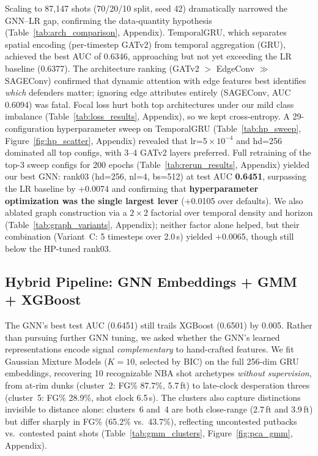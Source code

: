 \documentclass{article}
\begin{document}
Scaling to 87,147 shots (70/20/10 split, seed 42) dramatically narrowed the GNN--LR gap, confirming the data-quantity hypothesis (Table~\ref{tab:arch_comparison}, Appendix). TemporalGRU, which separates spatial encoding (per-timestep GATv2) from temporal aggregation (GRU), achieved the best AUC of 0.6346, approaching but not yet exceeding the LR baseline (0.6377). The architecture ranking (GATv2 $>$ EdgeConv $\gg$ SAGEConv) confirmed that dynamic attention with edge features best identifies \emph{which} defenders matter; ignoring edge attributes entirely (SAGEConv, AUC 0.6094) was fatal. Focal loss hurt both top architectures under our mild class imbalance (Table~\ref{tab:loss_results}, Appendix), so we kept cross-entropy. A 29-configuration hyperparameter sweep on TemporalGRU (Table~\ref{tab:hp_sweep}, Figure~\ref{fig:hp_scatter}, Appendix) revealed that lr=$5\!\times\!10^{-4}$ and hd=256 dominated all top configs, with 3--4 GATv2 layers preferred. Full retraining of the top-3 sweep configs for 200 epochs (Table~\ref{tab:rerun_results}, Appendix) yielded our best GNN: rank03 (hd=256, nl=4, bs=512) at test AUC \textbf{0.6451}, surpassing the LR baseline by +0.0074 and confirming that \textbf{hyperparameter optimization was the single largest lever} (+0.0105 over defaults). We also ablated graph construction via a $2\!\times\!2$ factorial over temporal density and horizon (Table~\ref{tab:graph_variants}, Appendix); neither factor alone helped, but their combination (Variant~C: 5 timesteps over 2.0\,s) yielded +0.0065, though still below the HP-tuned rank03.

\subsection{Hybrid Pipeline: GNN Embeddings + GMM + XGBoost}

The GNN's best test AUC (0.6451) still trails XGBoost (0.6501) by 0.005. Rather than pursuing further GNN tuning, we asked whether the GNN's learned representations encode signal \emph{complementary} to hand-crafted features. We fit Gaussian Mixture Models ($K\!=\!10$, selected by BIC) on the full 256-dim GRU embeddings, recovering 10 recognizable NBA shot archetypes \emph{without supervision}, from at-rim dunks (cluster~2: FG\% 87.7\%, 5.7\,ft) to late-clock desperation threes (cluster~5: FG\% 28.9\%, shot clock 6.5\,s). The clusters also capture distinctions invisible to distance alone: clusters~6 and~4 are both close-range (2.7\,ft and 3.9\,ft) but differ sharply in FG\% (65.2\% vs.\ 43.7\%), reflecting uncontested putbacks vs.\ contested paint shots (Table~\ref{tab:gmm_clusters}, Figure~\ref{fig:pca_gmm}, Appendix).
\end{document}
